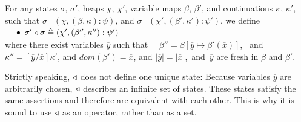 \begin{definition}
\label{d:adapt}
For any states $\sigma$, $\sigma'$, heaps $\chi$, $\chi'$, %
variable maps $\beta$, $\beta'$, 
and continuations $\kappa$, $\kappa'$, such that 
$\sigma$=$(\chi,(\beta,\kappa):\psi)$, and $\sigma$=$(\chi',(\beta',\kappa'):\psi')$, we define  
\\
$\strut \ \ \ \ \bullet$  $\sigma' \triangleleft \sigma \triangleq (\chi', (\beta'',\kappa'') : \psi')$  
\\
where there exist variables $\overline{y}$ such that \ \ $\beta'' =  \beta[\overline{y} \mapsto  {\beta'(\overline{x})}]$, \ and\  $\kappa''=[\overline{y}/\overline{x}]\kappa'$, and 
$dom(\beta')=\overline{x}$,  and $|\overline{y}| = |\overline{x}|$,\  and\  $\overline{y}$ are fresh in $\beta$ and $\beta'$.
\end{definition}

Strictly speaking, $\triangleleft$  does not define one  unique state: Because  variables $\overline{y}$ 
are arbitrarily chosen,   $\triangleleft$ describes an infinite set of states. These states satisfy the same assertions
and therefore are   equivalent with each 
other.
This is why it is sound to  use $\triangleleft$  as an operator, rather than as a set.
 


